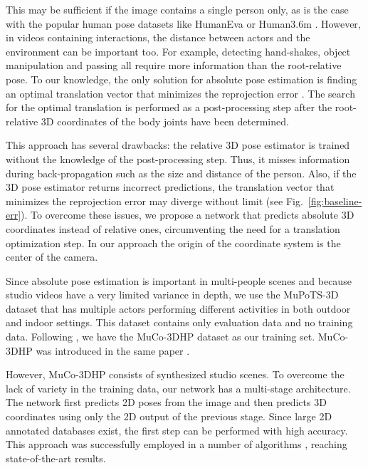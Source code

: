 \documentclass[conference]{IEEEtran}
\begin{document}
This may be sufficient if the image contains a single person only, as is the case with the popular human pose datasets like HumanEva \cite{humaneva} or Human3.6m \cite{h36m}. However, in videos containing interactions, the distance between actors and the environment can be important too.  For example, detecting hand-shakes, object manipulation and passing all require more information than the root-relative pose. To our knowledge, the only solution for absolute pose estimation is finding an optimal translation vector that minimizes the reprojection error \cite{mehta,zanfir2018smpl3dpose}. The search for the optimal translation is performed as a post-processing step after the root-relative 3D coordinates of the body joints have been determined.

This approach has several drawbacks: the relative 3D pose estimator is trained without the knowledge of the post-processing step. Thus, it misses information during back-propagation such as the size and distance of the person. Also, if the 3D pose estimator returns incorrect predictions, the translation vector that minimizes the reprojection error may diverge without limit (see Fig.~\ref{fig:baseline-err}). To overcome these issues, we propose a network that predicts absolute 3D coordinates instead of relative ones, circumventing the need for a translation optimization step. In our approach the origin of the coordinate system is the center of the camera.

Since absolute pose estimation is important in multi-people scenes and because studio videos have a very limited variance in depth, we use the MuPoTS-3D dataset \cite{mehta2018single_shot} that has multiple actors performing different activities in both outdoor and indoor settings. This dataset contains only evaluation data and no training data. Following \cite{mehta2018single_shot}, we have the MuCo-3DHP dataset as our training set. MuCo-3DHP  was introduced in the same paper \cite{mehta2018single_shot}.

However, MuCo-3DHP consists of synthesized studio scenes. To overcome the lack of variety in the training data, our network has a multi-stage architecture. The network first predicts 2D poses from the image and then predicts 3D coordinates using only the 2D output of the previous stage. Since large 2D annotated databases exist, the first step can be performed with high accuracy. This approach was successfully employed in a number of algorithms \cite{3dbaseline,fang2018posegrammar,lee2018pLSTM}, reaching state-of-the-art results. 
\end{document}
